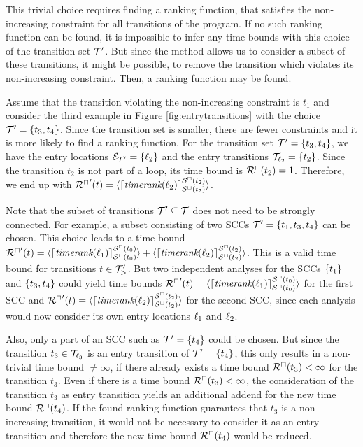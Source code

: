 This trivial choice requires finding a ranking function, that satisfies the non-increasing constraint for all transitions of the program.
If no such ranking function can be found, it is impossible to infer any time bounds with this choice of the transition set $\mathcal{T}'$.
But since the method allows us to consider a subset of these transitions, it might be possible, to remove the transition which violates its non-increasing constraint.
Then, a ranking function may be found.

Assume that the transition violating the non-increasing constraint is $t_1$ and consider the third example in Figure \ref{fig:entrytransitions} with the choice $\mathcal{T}' = \lbrace t_3, t_4 \rbrace$.
Since the transition set is smaller, there are fewer constraints and it is more likely to find a ranking function.
For the transition set $\mathcal{T}' = \lbrace t_3, t_4 \rbrace$, we have the entry locations $\mathcal{E}_{\mathcal{T}'} = \lbrace \ell_2 \rbrace$ and the entry transitions $\mathcal{T}_{\ell_2} = \lbrace t_2 \rbrace$.
Since the transition $t_2$ is not part of a loop, its time bound is ${\mathcal{R}^\sqcap}(t_2) = 1$.
Therefore, we end up with ${\mathcal{R}^\sqcap}'(t) = \langle\lceil \emph{timerank}(\ell_2) \rceil^{{\mathcal{S}^\sqcap}(t_2)}_{{\mathcal{S}^\sqcup}(t_2)}\rangle$.

Note that the subset of transitions $\mathcal{T}' \subseteq \mathcal{T}$ does not need to be strongly connected.
For example, a subset consisting of two SCCs $\mathcal{T}' = \lbrace t_1, t_3, t_4 \rbrace$ can be chosen.
This choice leads to a time bound ${\mathcal{R}^\sqcap}'(t) = \langle\lceil \emph{timerank}(\ell_1) \rceil^{{\mathcal{S}^\sqcap}(t_0)}_{{\mathcal{S}^\sqcup}(t_0)}\rangle + \langle\lceil \emph{timerank}(\ell_2) \rceil^{{\mathcal{S}^\sqcap}(t_2)}_{{\mathcal{S}^\sqcup}(t_2)}\rangle$.
This is a valid time bound for transitions $t \in \mathcal{T}'_>$.
But two independent analyses for the SCCs $\lbrace t_1 \rbrace$ and $\lbrace t_3, t_4 \rbrace$ could yield time bounds ${\mathcal{R}^\sqcap}'(t) = \langle\lceil \emph{timerank}(\ell_1) \rceil^{{\mathcal{S}^\sqcap}(t_0)}_{{\mathcal{S}^\sqcup}(t_0)}\rangle$ for the first SCC and ${\mathcal{R}^\sqcap}'(t) = \langle\lceil \emph{timerank}(\ell_2) \rceil^{{\mathcal{S}^\sqcap}(t_2)}_{{\mathcal{S}^\sqcup}(t_2)}\rangle$ for the second SCC, since each analysis would now consider its own entry locations $\ell_1$ and $\ell_2$.

Also, only a part of an SCC such as $\mathcal{T}' = \lbrace t_4 \rbrace$ could be chosen.
But since the transition $t_3 \in \mathcal{T}_{\ell_3}$ is an entry transition of $\mathcal{T}' = \lbrace t_4 \rbrace$, this only results in a non-trivial time bound $\neq \infty$, if there already exists a time bound ${\mathcal{R}^\sqcap}(t_3) < \infty$ for the transition $t_3$.
Even if there is a time bound ${\mathcal{R}^\sqcap}(t_3) < \infty$, the consideration of the transition $t_3$ as entry transition yields an additional addend for the new time bound ${\mathcal{R}^\sqcap}(t_4)$.
If the found ranking function guarantees that $t_3$ is a non-increasing transition, it would not be necessary to consider it as an entry transition and therefore the new time bound ${\mathcal{R}^\sqcap}(t_4)$ would be reduced.

